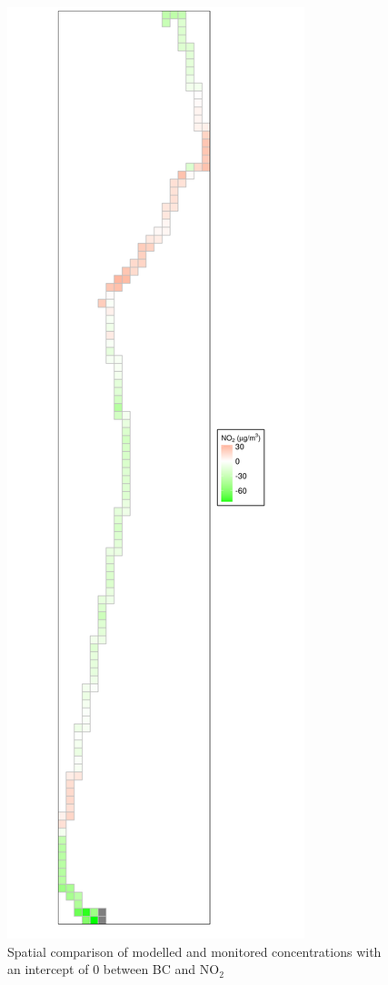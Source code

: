 \begin{figure}[H]
\centering
\includegraphics[scale=0.2]{images/monitored_minus_cmaq_route_cells_concs_zero_intercept.png}
\caption{Spatial comparison of modelled and monitored concentrations with an intercept of 0 between BC and NO$_{2}$}
\label{fig:monitored_minus_cmaq_route_cells_concs_zero_intercept}
\end{figure}

